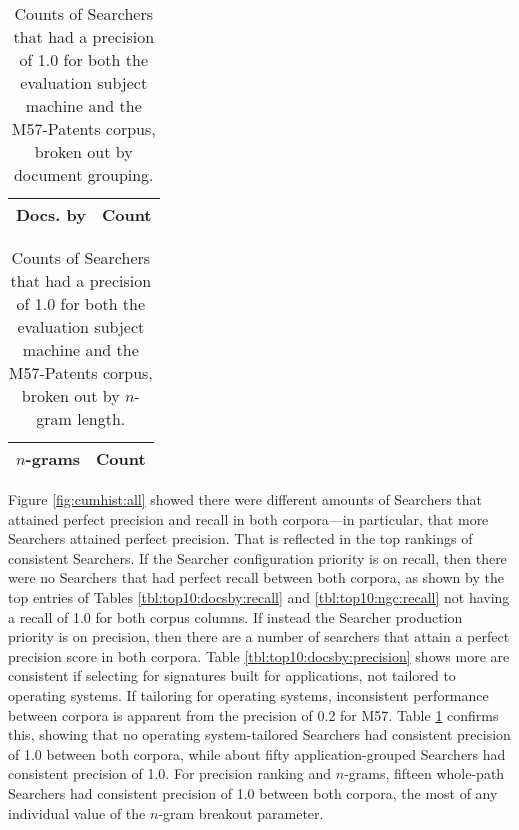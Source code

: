 \documentclass[11pt]{ucthesis}
\theoremstyle{plain}
\theoremstyle{definition}
\begin{document}
\begin{table}[htp]
\caption{\label{tbl:consistenttops:docsby}Counts of Searchers that had a precision of 1.0 for both the evaluation subject machine and the M57-Patents corpus, broken out by document grouping.}
\begin{center}
\begin{small}
\begin{tabular}{rr}
\toprule
Docs. by & Count \\
\midrule

\bottomrule
\end{tabular}
\end{small}
\end{center}
\end{table}

\begin{table}[htp]
\caption{\label{tbl:consistenttops:ngrams}Counts of Searchers that had a precision of 1.0 for both the evaluation subject machine and the M57-Patents corpus, broken out by $n$-gram length.}
\begin{center}
\begin{small}
\begin{tabular}{rr}
\toprule
$n$-grams & Count \\
\midrule

\bottomrule
\end{tabular}
\end{small}
\end{center}
\end{table}

Figure \ref{fig:cumhist:all} showed there were different amounts of Searchers that attained perfect precision and recall in both corpora---in particular, that more Searchers attained perfect precision.  That is reflected in the top rankings of consistent Searchers.  If the Searcher configuration priority is on recall, then there were no Searchers that had perfect recall between both corpora, as shown by the top entries of Tables \ref{tbl:top10:docsby:recall} and \ref{tbl:top10:ngc:recall} not having a recall of 1.0 for both corpus columns.  If instead the Searcher production priority is on precision, then there are a number of searchers that attain a perfect precision score in both corpora.  Table \ref{tbl:top10:docsby:precision} shows more are consistent if selecting for signatures built for applications, not tailored to operating systems.  If tailoring for operating systems, inconsistent performance between corpora is apparent from the precision of 0.2 for M57.  Table \ref{tbl:consistenttops:docsby} confirms this, showing that no operating system-tailored Searchers had consistent precision of 1.0 between both corpora, while about fifty application-grouped Searchers had consistent precision of 1.0.  For precision ranking and $n$-grams, fifteen whole-path Searchers had consistent precision of 1.0 between both corpora, the most of any individual value of the $n$-gram breakout parameter.
\end{document}

